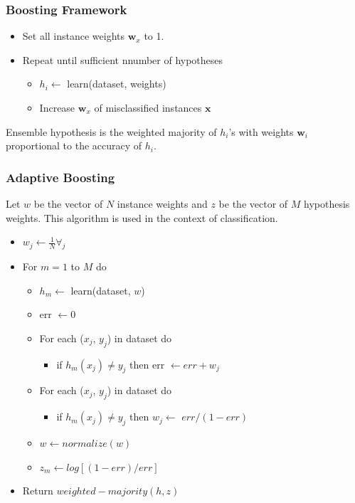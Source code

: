 \documentclass[12pt]{article}
\begin{document}
        \subsubsection{Boosting Framework}
            \begin{itemize}
                \item Set all instance weights $\boldsymbol{w}_x$ to 1.
                \item Repeat until sufficient nnumber of hypotheses
                \begin{itemize}
                    \item $h_i \leftarrow$ learn(dataset, weights)
                    \item Increase $\boldsymbol{w}_x$ of misclassified instances $\boldsymbol{x}$
                \end{itemize}
            \end{itemize}
            Ensemble hypothesis is the weighted majority of $h_i$'s with weights $\boldsymbol{w}_i$ proportional to the
            accuracy of $h_i$.

        \subsubsection{Adaptive Boosting} \label{sec:AdaBoost}
            Let $w$ be the vector of $N$ instance weights and $z$ be the vector of $M$ hypothesis weights. This
            algorithm is used in the context of classification.

            \begin{itemize}
                \item $w_j \leftarrow \frac{1}{N} \forall_j $
                \item For $m=1$ to $M$ do
                \begin{itemize}
                    \item $h_m \leftarrow$ learn(dataset, $w$)
                    \item err $\leftarrow 0$
                    \item For each ($x_j$, $y_j$) in dataset do
                    \begin{itemize}
                        \item if $h_m(x_j) \neq y_j$ then err $\leftarrow err + w_j$
                    \end{itemize}
                    \item For each ($x_j$, $y_j$) in dataset do
                    \begin{itemize}
                        \item if $h_m(x_j) \neq y_j$ then $w_j \leftarrow$ $err / (1-err)$
                    \end{itemize}
                    \item $w \leftarrow normalize(w)$
                    \item $z_m \leftarrow log[(1-err)/err]$
                \end{itemize}
                \item Return $weighted-majority(h,z)$
            \end{itemize}
        
\end{document}

